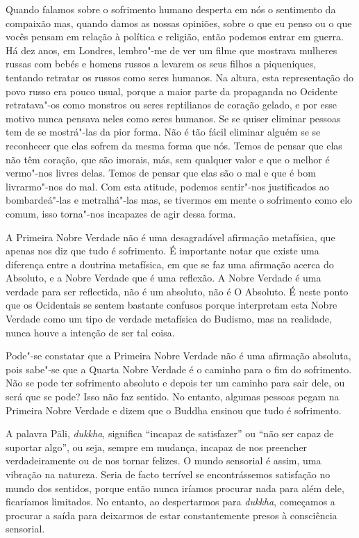 Quando falamos sobre o sofrimento humano desperta em nós o sentimento da
compaixão mas, quando damos as nossas opiniões, sobre o que eu penso ou o que
vocês pensam em relação à política e religião, então podemos entrar em guerra.
Há dez anos, em Londres, lembro"-me de ver um filme que mostrava mulheres russas
com bebés e homens russos a levarem os seus filhos a piqueniques, tentando
retratar os russos como seres humanos. Na altura, esta representação do povo
russo era pouco usual, porque a maior parte da propaganda no Ocidente
retratava"-os como monstros ou seres reptilianos de coração gelado, e por esse
motivo nunca pensava neles como seres humanos. Se se quiser eliminar pessoas tem
de se mostrá"-las da pior forma. Não é tão fácil eliminar alguém se se reconhecer que
elas sofrem da mesma forma que nós. Temos de pensar que elas não têm coração,
que são imorais, más, sem qualquer valor e que o melhor é vermo"-nos livres
delas. Temos de pensar que elas são o mal e que é bom livrarmo"-nos do mal. Com
esta atitude, podemos sentir"-nos justificados ao bombardeá"-las e metralhá"-las
mas, se tivermos em mente o sofrimento como elo comum, isso torna"-nos incapazes
de agir dessa forma.

A Primeira Nobre Verdade não é uma desagradável afirmação metafísica, que apenas
nos diz que tudo é sofrimento. É importante notar que existe uma diferença entre
a doutrina metafísica, em que se faz uma afirmação acerca do Absoluto, e a Nobre
Verdade que é uma reflexão. A Nobre Verdade é uma verdade para ser reflectida,
não é um absoluto, não é O Absoluto. É neste ponto que os Ocidentais se sentem
bastante confusos porque interpretam esta Nobre Verdade como um tipo de verdade
metafísica do Budismo, mas na realidade, nunca houve a intenção de ser tal
coisa.

Pode"-se constatar que a Primeira Nobre Verdade não é uma afirmação absoluta,
pois sabe"-se que a Quarta Nobre Verdade é o caminho para o fim do sofrimento.
Não se pode ter sofrimento absoluto e depois ter um caminho para sair dele, ou
será que se pode? Isso não faz sentido. No entanto, algumas pessoas pegam na
Primeira Nobre Verdade e dizem que o Buddha ensinou que tudo é sofrimento.

A palavra Pāli, \emph{dukkha}, significa “incapaz de satisfazer” ou “não ser
capaz de suportar algo”, ou seja, sempre em mudança, incapaz de nos preencher
verdadeiramente ou de nos tornar felizes. O mundo sensorial é assim, uma
vibração na natureza. Seria de facto terrível se encontrássemos satisfação no
mundo dos sentidos, porque então nunca iríamos procurar nada para além dele, ficaríamos
limitados. No entanto, ao despertarmos para \emph{dukkha}, começamos a procurar
a saída para deixarmos de estar constantemente presos à consciência sensorial.

